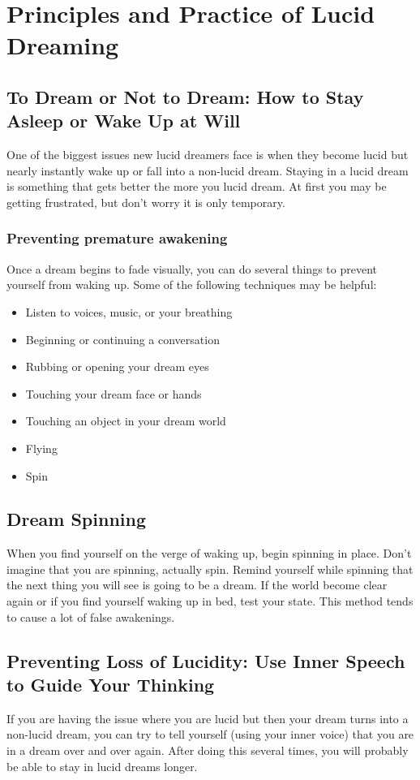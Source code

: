 \documentclass{book}
\begin{document}
\chapter{Principles and Practice of Lucid Dreaming}
\section{To Dream or Not to Dream: How to Stay Asleep or Wake Up at Will}
One of the biggest issues new lucid dreamers face is when they become lucid but nearly instantly wake up or fall into a non-lucid dream. Staying in a lucid dream is something that gets better the more you lucid dream. At first you may be getting frustrated, but don't worry it is only temporary. 

\subsection{Preventing premature awakening}
Once a dream begins to fade visually, you can do several things to prevent yourself from waking up. Some of the following techniques may be helpful:

\begin {itemize}
	\item Listen to voices, music, or your breathing
	\item Beginning or continuing a conversation
	\item Rubbing or opening your dream eyes
	\item Touching your dream face or hands
	\item Touching an object in your dream world
	\item Flying
	\item Spin
\end {itemize}


\section{Dream Spinning}
When you find yourself on the verge of waking up, begin spinning in place. Don't imagine that you are spinning, actually spin. Remind yourself while spinning that the next thing you will see is going to be a dream. If the world become clear again or if you find yourself waking up in bed, test your state. This method tends to cause a lot of false awakenings. 

\section{Preventing Loss of Lucidity: Use Inner Speech to Guide Your Thinking}
If you are having the issue where you are lucid but then your dream turns into a non-lucid dream, you can try to tell yourself (using your inner voice) that you are in a dream over and over again. After doing this several times, you will probably be able to stay in lucid dreams longer. 
\end{document}
